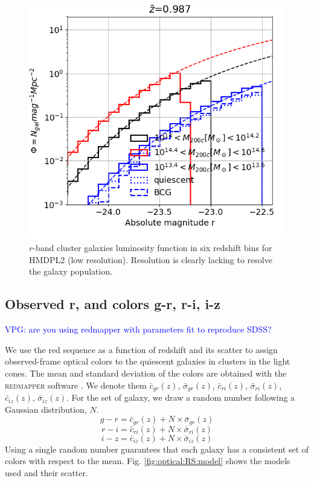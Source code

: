 \documentclass[fleqn,usenatbib,onecolumn]{mnras}
\begin{document}
\begin{figure}
\includegraphics[width=.6\columnwidth,type=png,ext=.png,read=.png]{figures/MD40_cluster_galaxy_LF_z_050320}

\caption{\label{fig:optical:LF:MD40}$r$-band cluster galaxies luminosity function in six redshift bins for HMDPL2 (low resolution). Resolution is clearly lacking to resolve the galaxy population. }
\end{figure}

\subsection{Observed r, and colors g-r, r-i, i-z}

\textcolor{blue}{VPG: are you using redmapper with parameters fit to reproduce SDSS?}

We use the red sequence as a function of redshift and its scatter to assign observed-frame optical colors to the quiescent galaxies in clusters in the light cones.  
The mean and standard deviation of the colors are obtained with the \textsc{redmapper} software \citep{2014ApJ...785..104R,2015MNRAS.453...38R}. 
We denote them $\bar{c}_{gr}(z)$, $\bar{\sigma}_{gr}(z)$, $\bar{c}_{ri}(z)$, $\bar{\sigma}_{ri}(z)$, $\bar{c}_{iz}(z)$, $\bar{\sigma}_{iz}(z)$. 
For the set of galaxy, we draw a random number following a Gaussian distribution, $N$. 
\begin{equation}
 g-r = \bar{c}_{gr}(z) + N \times \bar{\sigma}_{gr}(z)
\end{equation}
\begin{equation}
 r-i = \bar{c}_{ri}(z) + N \times \bar{\sigma}_{ri}(z)
\end{equation}
\begin{equation}
 i-z = \bar{c}_{iz}(z) + N \times \bar{\sigma}_{iz}(z)
\end{equation}
Using a single random number guarantees that each galaxy has a consistent set of colors with respect to the mean. 
Fig. \ref{fig:optical:RS:model} shows the models used and their scatter. 
\end{document}
